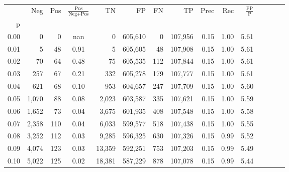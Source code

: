 \begin{tabular}{rrrcrrrrrrrrrrr}
\toprule
{} &     Neg &    Pos & $\frac{\text{Pos}}{\text{Neg}+\text{Pos}}$ &       TN &       FP &       FN &       TP &  Prec &   Rec & $\frac{\text{FP}}{\text{P}}$ \\
p    &         &        &                                            &          &          &          &          &       &       &                              \\
\midrule
0.00 &       0 &      0 &                                        nan &        0 &  605,610 &        0 &  107,956 &  0.15 &  1.00 &                         5.61 \\
0.01 &       5 &     48 &                                       0.91 &        5 &  605,605 &       48 &  107,908 &  0.15 &  1.00 &                         5.61 \\
0.02 &      70 &     64 &                                       0.48 &       75 &  605,535 &      112 &  107,844 &  0.15 &  1.00 &                         5.61 \\
0.03 &     257 &     67 &                                       0.21 &      332 &  605,278 &      179 &  107,777 &  0.15 &  1.00 &                         5.61 \\
0.04 &     621 &     68 &                                       0.10 &      953 &  604,657 &      247 &  107,709 &  0.15 &  1.00 &                         5.60 \\
0.05 &   1,070 &     88 &                                       0.08 &    2,023 &  603,587 &      335 &  107,621 &  0.15 &  1.00 &                         5.59 \\
0.06 &   1,652 &     73 &                                       0.04 &    3,675 &  601,935 &      408 &  107,548 &  0.15 &  1.00 &                         5.58 \\
0.07 &   2,358 &    110 &                                       0.04 &    6,033 &  599,577 &      518 &  107,438 &  0.15 &  1.00 &                         5.55 \\
0.08 &   3,252 &    112 &                                       0.03 &    9,285 &  596,325 &      630 &  107,326 &  0.15 &  0.99 &                         5.52 \\
0.09 &   4,074 &    123 &                                       0.03 &   13,359 &  592,251 &      753 &  107,203 &  0.15 &  0.99 &                         5.49 \\
0.10 &   5,022 &    125 &                                       0.02 &   18,381 &  587,229 &      878 &  107,078 &  0.15 &  0.99 &                         5.44 \\

\end{tabular}
